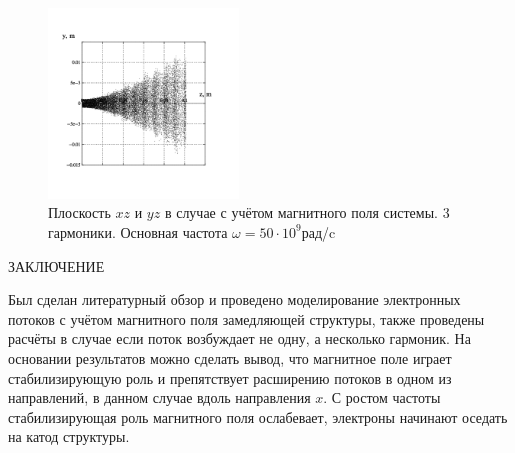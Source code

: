 \documentclass[a4paper,14pt]{extreport} %
\begin{document}
\begin{figure}[!ht]
{	}
	\parbox{0.48\textwidth}{
		\includegraphics[width = 0.45\textwidth]{images/png/withmf/3x50yz.png}
	}
	\caption{Плоскость $xz$ и $yz$ в случае с учётом магнитного поля системы. 3 гармоники. Основная частота	$\omega = 50\cdot10^9$рад/c}
	\label{fig4}
\end{figure}


\clearpage


\begin{center}
	\MakeUppercase{Заключение}
\end{center}

Был сделан литературный обзор и проведено моделирование электронных потоков с учётом магнитного поля замедляющей структуры, также проведены расчёты в случае если поток возбуждает не одну, а несколько гармоник. На основании результатов можно сделать вывод, что магнитное поле играет стабилизирующую роль и препятствует расширению потоков в одном из направлений, в данном случае вдоль направления $x$. С ростом частоты стабилизирующая роль магнитного поля ослабевает, электроны начинают оседать на катод структуры.

\clearpage



\end{document}
